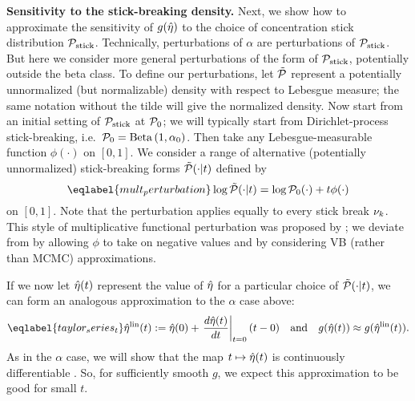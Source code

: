 \noindent \textbf{Sensitivity to the stick-breaking density.} Next, we show how
to approximate the sensitivity of $g(\hat\eta)$ to the choice of concentration
stick distribution $\mathcal{P}_{\mathrm{stick}}$. Technically, perturbations of $\alpha$ are
perturbations of $\mathcal{P}_{\mathrm{stick}}$. But here we consider more general perturbations of
the form of $\mathcal{P}_{\mathrm{stick}}$, potentially outside the beta class. To define our
perturbations, let $\tilde{\mathcal{P}}$ represent a potentially unnormalized (but
normalizable) density with respect to Lebesgue measure; the same notation
without the tilde will give the normalized density. Now start from an initial
setting of $\mathcal{P}_{\mathrm{stick}}$ at $\mathcal{P}_{0}$; we will typically start from Dirichlet-process
stick-breaking, i.e.\ $\mathcal{P}_{0} = \mathrm{Beta}\left(1,\alpha_0\right)$. Then take any
Lebesgue-measurable function $\phi(\cdot)$ on $[0,1]$. We consider a range of
alternative (potentially unnormalized) stick-breaking forms $\tilde{\mathcal{P}}(\cdot \vert
t)$ defined by
%
\begin{equation} \eqlabel{mult_perturbation}
	\log \ptil(\cdot \vert \t) = \log \pbase(\cdot) + \t \phi(\cdot)
\end{equation}
%
on $[0,1]$. Note that the perturbation applies equally to every stick break
$\nu_{k}$. This style of multiplicative functional perturbation was proposed by
\citet{gustafson:1996:local}; we deviate from \citet{gustafson:1996:local} by
allowing $\phi$ to take on negative values and by considering VB (rather than
MCMC) approximations.

If we now let $\hat\eta(t)$ represent the value of $\hat\eta$ for a particular
choice of $\tilde{\mathcal{P}}(\cdot \vert t)$, we can form an analogous approximation to the
$\alpha$ case above:
%
\begin{align} \eqlabel{taylor_series_t}
%
\etalin(\t) :=
    \etaopt(0) +
    \fracat{d\etaopt(t)}{dt}{\t=0} (\t - 0)
\mathand
g(\etaopt(\t)) \approx g(\etalin(\t)).
%
\end{align}
%
As in the $\alpha$ case, we will show that the map $t \mapsto \hat\eta(t)$ is
continuously differentiable . So, for sufficiently smooth $g$, we expect this
approximation to be good for small $t$.

